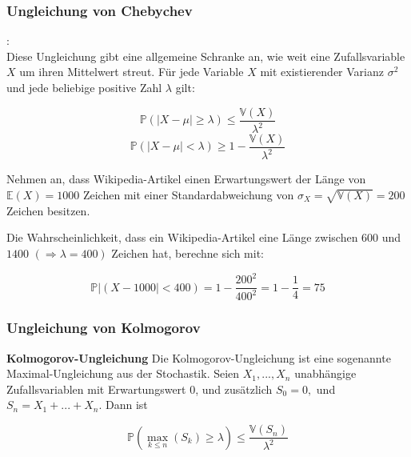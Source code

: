 {    \subsubsection{Ungleichung von Chebychev
        }

    \begin{definition}:\\
        Diese Ungleichung gibt eine allgemeine Schranke an, wie weit eine Zufallsvariable 
        $X$ um ihren Mittelwert streut. Für jede Variable $X$ mit existierender Varianz $\sigma^{2}$ und
        jede beliebige positive Zahl $\lambda$ gilt:

        \[\mathbb P\left(\left|X-\mu \right|\ge \lambda \right)\le \frac{\mathbb V(X)}{\lambda^{2}}\]
        \[\mathbb P\left(\left|X-\mu \right|<\lambda \right)\ge 1-\frac{\mathbb V(X)}{\lambda ^{2}}\]
    \end{definition}

    \begin{bsp} Nehmen an, dass Wikipedia-Artikel einen Erwartungswert der Länge von 
    $\mathbb E\left(X\right)=1000$ Zeichen mit einer Standardabweichung von 
    $\sigma_{X}=\sqrt{\mathbb V\left(X\right)}=200$ Zeichen besitzen. 

    Die Wahrscheinlichkeit, dass ein Wikipedia-Artikel eine
    Länge zwischen $600$ und $1400$ $\left(\Rightarrow \lambda=400\right)$ Zeichen hat, berechne sich mit:

    \[
        \mathbb P\left|\left(X-1000\right|<400\right)=1-\frac{200^{2}}{400^{2}}=1-\frac{1}{4}=75
    \]
    \end{bsp}

    \subsubsection{Ungleichung von Kolmogorov
        }
    \begin{definition}\textbf{Kolmogorov-Ungleichung}
    Die Kolmogorov-Ungleichung ist eine sogenannte Maximal-Ungleichung aus
    der Stochastik. Seien $X_{1},... ,X_{n}$ unabhängige Zufallsvariablen mit
    Erwartungswert 0, und zusätzlich $S_{0}=0,$ und $S_{n}=X_{1}+... +X_{n}$. Dann ist

    \[\mathbb P\left(\max_{k\le n}\left(S_{k}\right)\ge \lambda\right)\le 
        \frac{\mathbb V\left(S_{n}\right)}{\lambda ^{2}}\]
    \end{definition}
    
}
